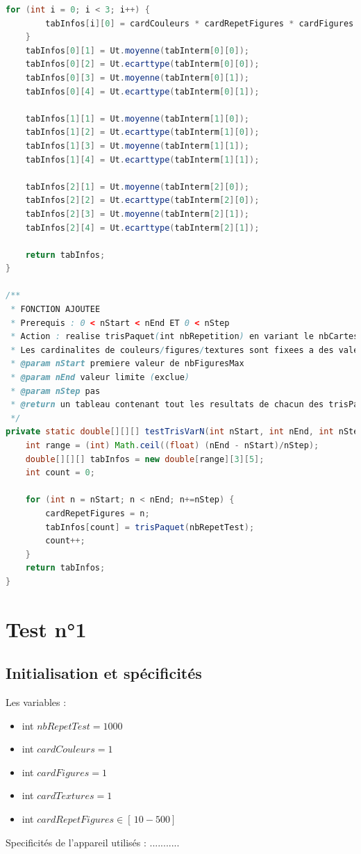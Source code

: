 \documentclass{report}
\begin{document}
\begin{lstlisting}[language=java, caption={\it Fonctions de calculs de données expérimentales}, label=codeTRI]
    for (int i = 0; i < 3; i++) {
        tabInfos[i][0] = cardCouleurs * cardRepetFigures * cardFigures * cardTextures;
    }
    tabInfos[0][1] = Ut.moyenne(tabInterm[0][0]);
    tabInfos[0][2] = Ut.ecarttype(tabInterm[0][0]);
    tabInfos[0][3] = Ut.moyenne(tabInterm[0][1]);
    tabInfos[0][4] = Ut.ecarttype(tabInterm[0][1]);
    
    tabInfos[1][1] = Ut.moyenne(tabInterm[1][0]);
    tabInfos[1][2] = Ut.ecarttype(tabInterm[1][0]);
    tabInfos[1][3] = Ut.moyenne(tabInterm[1][1]); 
    tabInfos[1][4] = Ut.ecarttype(tabInterm[1][1]);

    tabInfos[2][1] = Ut.moyenne(tabInterm[2][0]);
    tabInfos[2][2] = Ut.ecarttype(tabInterm[2][0]);
    tabInfos[2][3] = Ut.moyenne(tabInterm[2][1]); 
    tabInfos[2][4] = Ut.ecarttype(tabInterm[2][1]);

    return tabInfos;
}

/**
 * FONCTION AJOUTEE
 * Prerequis : 0 < nStart < nEnd ET 0 < nStep 
 * Action : realise trisPaquet(int nbRepetition) en variant le nbCartes en modifiant la cardinalite de nbFigures, entre en parametres, de nStart a nEnd(exclu) en faisant des pas de nStep.
 * Les cardinalites de couleurs/figures/textures sont fixees a des valeurs constantes par les variables de class.
 * @param nStart premiere valeur de nbFiguresMax
 * @param nEnd valeur limite (exclue)
 * @param nStep pas
 * @return un tableau contenant tout les resultats de chacun des trisPaquet().
 */
private static double[][][] testTrisVarN(int nStart, int nEnd, int nStep) {
    int range = (int) Math.ceil((float) (nEnd - nStart)/nStep);
    double[][][] tabInfos = new double[range][3][5];
    int count = 0;
    
    for (int n = nStart; n < nEnd; n+=nStep) {
        cardRepetFigures = n;
        tabInfos[count] = trisPaquet(nbRepetTest);
        count++;
    }
    return tabInfos;
}
\end{lstlisting}



\newpage
\section{Test n°1}
\subsection{Initialisation et spécificités}
Les variables :
\begin{itemize}
	\item int $nbRepetTest = 1000$
	\item int $cardCouleurs = 1$
	\item int $cardFigures = 1$
	\item int $cardTextures = 1$
	\item int $cardRepetFigures \in [\, 10-500 ]\, $
\end{itemize}
Specificités de l'appareil utilisés : ...........
\end{document}
